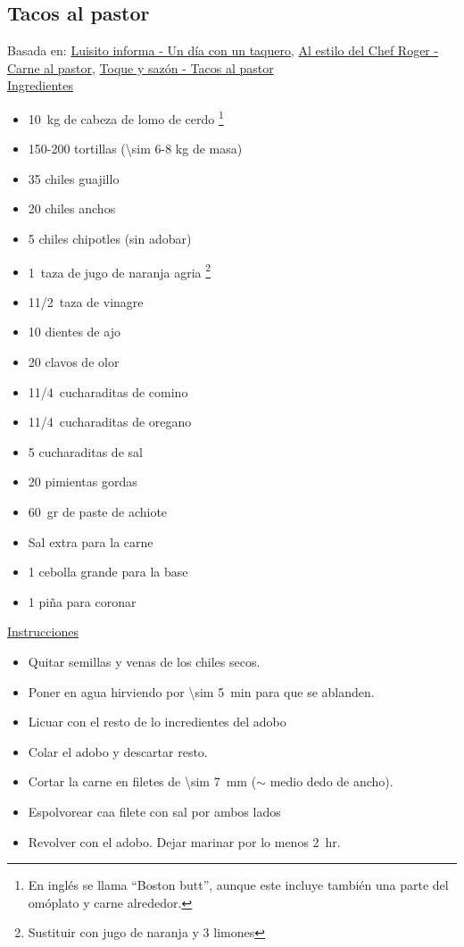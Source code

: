 \subsection{Tacos al pastor}

Basada en: \href{https://www.youtube.com/watch?v=W03EIyBCOPI&list=LL70vwP7i8PV9gx3t6SvBbRQ&index=598}{Luisito informa - Un día con un taquero}, \href{https://www.youtube.com/watch?v=F7N3l6XGn-0}{Al estilo del Chef Roger - Carne al pastor},
\href{https://www.youtube.com/watch?v=pmzl92R3rJk}{Toque y sazón - Tacos al pastor}\\

\underline{Ingredientes}

\begin{itemize}
\item \SI{10}{kg} de cabeza de lomo de cerdo \footnote{En inglés se llama ``Boston butt'', aunque este incluye también una parte del omóplato y carne alrededor.}
\item 150-200 tortillas (\num{\sim 6}-8 kg de masa)
\item 35 chiles guajillo
\item 20 chiles anchos
\item 5 chiles chipotles (sin adobar)
\item \SI{1}{taza} de jugo de naranja agria \footnote{Sustituir con jugo de naranja y 3 limones}
\item 1\SI{1/2}{taza} de vinagre
\item 10 dientes de ajo
\item 20 clavos de olor
\item 1\SI{1/4}{cucharaditas} de comino
\item 1\SI{1/4}{cucharaditas} de oregano
\item 5 cucharaditas de sal
\item 20 pimientas gordas
\item \SI{60}{gr} de paste de achiote
\item Sal extra para la carne
\item 1 cebolla grande para la base
\item 1 piña para coronar
\end{itemize}

\underline{Instrucciones}
\begin{itemize}
\item Quitar semillas y venas de los chiles secos.
\item Poner en agua hirviendo por \SI{\sim 5}{min} para que se ablanden.
\item Licuar con el resto de lo incredientes del adobo
\item Colar el adobo y descartar resto.
\item Cortar la carne en filetes de \SI{\sim 7}{mm} ($\sim$ medio dedo de ancho).
\item Espolvorear caa filete con sal por ambos lados
\item Revolver con el adobo. Dejar marinar por lo menos \SI{2}{hr}.
\end{itemize}


